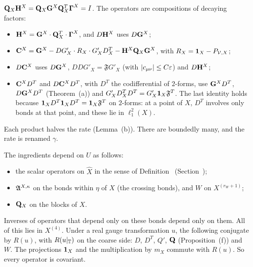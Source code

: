 \begin{detail}\label{d8:ix1}
\begin{step}[(b)]
$\mathbf Q_X\mathbf H^X=\mathbf Q_X\mathbf G^X\mathbf Q_X^T\boldsymbol\Gamma^X=I$. The operators are compositions of decaying factors:
\begin{itemize}
\item $\mathbf H^X=\mathbf G^X\cdot\mathbf Q_X^T\cdot\boldsymbol\Gamma^X$, and $D\mathbf H^X$ uses $D\mathbf G^X$;
\item $\mathbf C^X=\mathbf G^X-DG'_X\cdot R_X\cdot G'_XD^T_X-\mathbf H^X\mathbf Q_X\mathbf G^X$, with $R_X=\mathbf 1_X-P_{\mathcal V,X}$;
\item $D\mathbf C^X$ uses $D\mathbf G^X$, $DDG'_X=\mathfrak FG'_X$ (with $|c_{\mu\nu}|\le C\varepsilon$) and $D\mathbf H^X$;
\item $\mathbf C^XD^T$ and $D\mathbf C^XD^T$, with $D^T$ the codifferential of $2$-forms, use $\mathbf G^XD^T$, $D\mathbf G^XD^T$ (Theorem~(a)) and $G'_XD^T_XD^T=G'_X\mathbf 1_X\mathfrak F^T$. The last identity holds because $\mathbf 1_XD^T\mathbf 1_XD^T=\mathbf 1_X\mathfrak F^T$ on $2$-forms: at a point of $X$, $D^T$ involves only bonds at that point, and these lie in $\ell^2_1(X)$.
\end{itemize}
Each product halves the rate (Lemma~(b)). There are boundedly many, and the rate is renamed $\gamma$.
\end{step}
\begin{step}[(c)]
The ingredients depend on $U$ as follows:
\begin{itemize}
\item the scalar operators on $\hat X$ in the sense of Definition~ (Section~);
\item $\mathfrak A^{X,\kappa}$ on the bonds within $\eta$ of $X$ (the crossing bonds), and $W$ on $X^{(r_W+1)}$;
\item $\mathbf Q_X$ on the blocks of $X$.
\end{itemize}
Inverses of operators that depend only on these bonds depend only on them. All of this lies in $X^{(4)}$. Under a real gauge transformation $u$, the following conjugate by $R(u)$, with $R(u|_\mathbb T)$ on the coarse side: $D$, $D^T$, $Q'$, $\mathbf Q$ (Proposition~(f)) and $W$. The projections $\mathbf 1_X$ and the multiplication by $m_X$ commute with $R(u)$. So every operator is covariant.
\end{step}
\end{detail}

